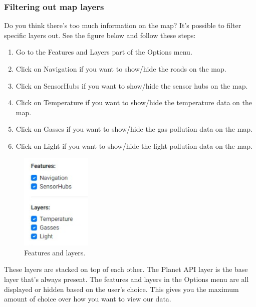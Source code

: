 \documentclass[a4paper]{article}
\begin{document}
\subsubsection*{Filtering out map layers}
Do you think there's too much information on the map? It's possible to filter specific layers out. See the figure below and follow these steps:
\begin{enumerate}
\item Go to the Features and Layers part of the Options menu.
\item Click on Navigation if you want to show/hide the roads on the map.
\item Click on SensorHubs if you want to show/hide the sensor hubs on the map.
\item Click on Temperature if you want to show/hide the temperature data on the map.
\item Click on Gasses if you want to show/hide the gas pollution data on the map.
\item Click on Light if you want to show/hide the light pollution data on the map.
\end{enumerate}
\begin{figure}[h!]
  \caption{Features and layers.}
  \centering
  \includegraphics[width=0.3\textwidth]{features-layers}
\end{figure}
These layers are stacked on top of each other. The Planet API layer is the base layer that's always present. The features and layers in the Options menu are all displayed or hidden based on the user's choice. This gives you the maximum amount of choice over how you want to view our data.
\newline
\end{document}
